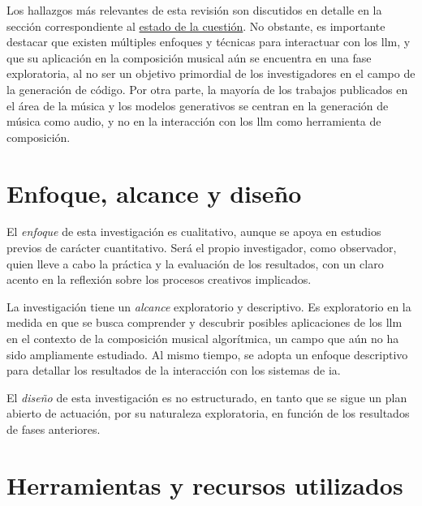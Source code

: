 Los hallazgos más relevantes de esta revisión son discutidos en detalle en la sección correspondiente al \hyperref[chap:estado_cuestion]{estado de la cuestión}. No obstante, es importante destacar que existen múltiples enfoques y técnicas para interactuar con los \gls{llm}, y que su aplicación en la composición musical aún se encuentra en una fase exploratoria, al no ser un objetivo primordial de los investigadores en el campo de la generación de código. Por otra parte, la mayoría de los trabajos publicados en el área de la música y los modelos generativos se centran en la generación de música como audio, y no en la interacción con los \gls{llm} como herramienta de composición. 

\section{Enfoque, alcance y diseño}

El \emph{enfoque} de esta investigación es {cualitativo}, aunque se apoya en estudios previos de carácter cuantitativo. Será el propio investigador, como observador, quien lleve a cabo la práctica y la evaluación de los resultados, con un claro acento en la reflexión sobre los procesos creativos implicados.

La investigación tiene un \emph{alcance} {exploratorio} y {descriptivo}. Es exploratorio en la medida en que se busca comprender y descubrir posibles aplicaciones de los \gls{llm} en el contexto de la composición musical algorítmica, un campo que aún no ha sido ampliamente estudiado. Al mismo tiempo, se adopta un enfoque descriptivo para detallar los resultados de la interacción con los sistemas de \gls{ia}.

El \emph{diseño} de esta investigación es {no estructurado}, en tanto que se sigue un plan abierto de actuación, por su naturaleza exploratoria, en función de los resultados de fases anteriores.

\section{Herramientas y recursos utilizados}


